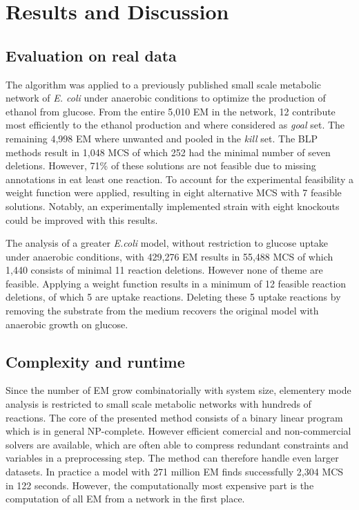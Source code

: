 \documentclass{llncs}
\begin{document}
\section{Results and Discussion}

\subsection{Evaluation on real data}

The algorithm was applied to a previously published small scale 
metabolic network of \emph{E. coli} under anaerobic conditions to 
optimize the production of ethanol from glucose.
From the entire 5,010 EM in the network, 12 contribute most efficiently
to the ethanol production and where considered as \emph{goal} set. The
remaining 4,998 EM where unwanted and pooled in the \emph{kill} set.
The BLP methods result in 1,048 MCS of which 252 had the minimal number of
seven deletions. 
However, 71\% of these solutions are not feasible due to
missing annotations in eat least one reaction.
To account for the experimental feasibility a weight function were applied,
resulting in eight alternative MCS with 7 feasible solutions.
Notably, an experimentally implemented strain with eight knockouts could
be improved with this results.

The analysis of a greater \emph{E.coli} model, without restriction to glucose uptake under
anaerobic conditions, with 429,276 EM results in 55,488 MCS of which 1,440
consists of minimal 11 reaction deletions.
However none of theme are feasible.
Applying a weight function results in a minimum of 12 feasible reaction 
deletions, of which 5 are uptake reactions.
Deleting these 5 uptake reactions by removing the substrate from the medium
recovers the original model with anaerobic growth on glucose.

\subsection{Complexity and runtime}

Since the number of EM grow combinatorially with system size,
elementery mode analysis is restricted to small scale metabolic 
networks with hundreds of reactions.
The core of the presented method consists of a binary linear program which 
is in general NP-complete.
However efficient comercial and non-commercial solvers are available, 
which are often able to compress redundant constraints and variables 
in a preprocessing step.
The method can therefore handle even larger datasets.
In practice a model with 271 million EM finds successfully 2,304 MCS in 
122 seconds.
However, the computationally most expensive part is the computation of
all EM from a network in the first place.
\end{document}
